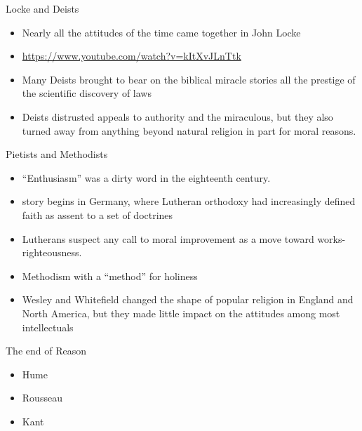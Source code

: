 \begin{frame}[label=sec-1-9]{Locke and Deists}
\begin{itemize}
\item Nearly all the attitudes of the time came together in John Locke
\item \url{https://www.youtube.com/watch?v=kItXvJLnTtk}
\item Many Deists brought to bear on the biblical miracle stories all the prestige of the scientific discovery of laws
\item Deists distrusted appeals to authority and the miraculous, but they also turned away from anything beyond natural religion in part for moral reasons.
\end{itemize}
\end{frame}
\begin{frame}[label=sec-1-10]{Pietists and Methodists}
\begin{itemize}
\item ``\alert{Enthusiasm}'' was a dirty word in the eighteenth century.
\item story begins in Germany, where Lutheran orthodoxy had increasingly defined faith as assent to a set of doctrines
\item Lutherans suspect any call to moral improvement as a move toward works-righteousness.
\item Methodism with a ``method'' for holiness
\item Wesley and Whitefield changed the shape of popular religion in England and North America, but they made little impact on the attitudes among most intellectuals
\end{itemize}
\end{frame}
\begin{frame}[label=sec-1-11]{The end of Reason}
\begin{itemize}
\item Hume
\item Rousseau
\item Kant
\end{itemize}
\end{frame}

